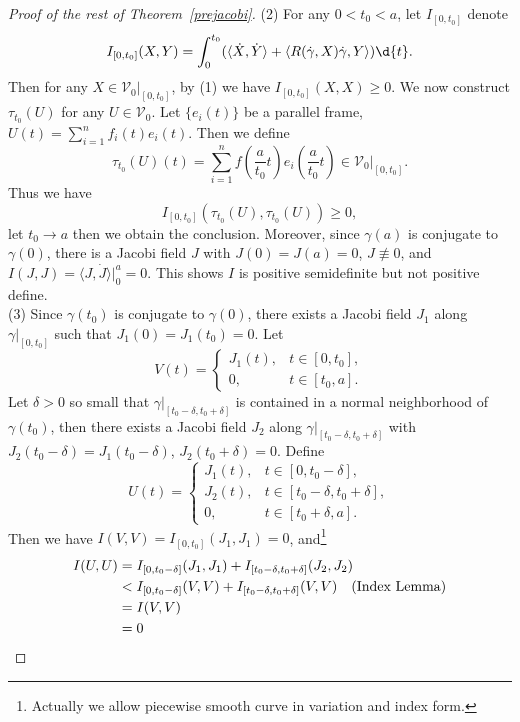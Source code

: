 \begin{proof}[Proof of the rest of Theorem~\ref{prejacobi}]
    (2) For any $0<t_0<a$, let $I_{[0,t_0]}$ denote
    \[I_{[0,t_0]}(X,Y)=\int_0^{t_0}(\langle\dot{X},\dot{Y}\rangle+\langle R(\dot{\gamma},X)\dot{\gamma},Y\rangle)\d{t}.\]
    Then for any $X\in\mathscr{V}_0|_{[0,t_0]}$, by (1) we have $I_{[0,t_0]}(X,X)\geq 0$.
    We now construct $\tau_{t_0}(U)$ for any $U\in\mathscr{V}_0$.
    Let $\{e_i(t)\}$ be a parallel frame, $U(t)=\sum_{i=1}^nf_i(t)e_i(t)$.
    Then we define
    \[\tau_{t_0}(U)(t)=\sum_{i=1}^nf\left(\frac{a}{t_0}t\right)e_i\left(\frac{a}{t_0}t\right)\in\mathscr{V}_0|_{[0,t_0]}.\]
    Thus we have
    \[I_{[0,t_0]}(\tau_{t_0}(U),\tau_{t_0}(U))\geq 0,\]
    let $t_0\to a$ then we obtain the conclusion.
    Moreover, since $\gamma(a)$ is conjugate to $\gamma(0)$, there is a Jacobi field $J$ with $J(0)=J(a)=0$, $J\not\equiv 0$, and $I(J,J)=\langle J,\dot{J}\rangle|^a_0=0$.
    This shows $I$ is positive semidefinite but not positive define.\\
    (3) Since $\gamma(t_0)$ is conjugate to $\gamma(0)$, there exists a Jacobi field $J_1$ along $\gamma|_{[0,t_0]}$ such that $J_1(0)=J_1(t_0)=0$.
    Let
    \[V(t)=\begin{cases}
        J_1(t), & t\in[0,t_0],\\
        0, & t\in[t_0,a].
    \end{cases}\]
    Let $\delta>0$ so small that $\gamma|_{[t_0-\delta,t_0+\delta]}$ is contained in a normal neighborhood of $\gamma(t_0)$, then there exists a Jacobi field $J_2$ along $\gamma|_{[t_0-\delta,t_0+\delta]}$ with $J_2(t_0-\delta)=J_1(t_0-\delta)$, $J_2(t_0+\delta)=0$.
    Define
    \[U(t)=\begin{cases}
        J_1(t), & t\in[0,t_0-\delta],\\
        J_2(t), & t\in[t_0-\delta,t_0+\delta],\\
        0, & t\in[t_0+\delta,a].
    \end{cases}\]
    Then we have $I(V,V)=I_{[0,t_0]}(J_1,J_1)=0$, and\footnote{Actually we allow piecewise smooth curve in variation and index form.}
    \begin{align*}
        I(U,U)&=I_{[0,t_0-\delta]}(J_1,J_1)+I_{[t_0-\delta,t_0+\delta]}(J_2,J_2)\\
        &<I_{[0,t_0-\delta]}(V,V)+I_{[t_0-\delta,t_0+\delta]}(V,V)\quad\text{(Index Lemma)}\\
        &=I(V,V)\\
        &=0\qedhere
    \end{align*}
\end{proof}

